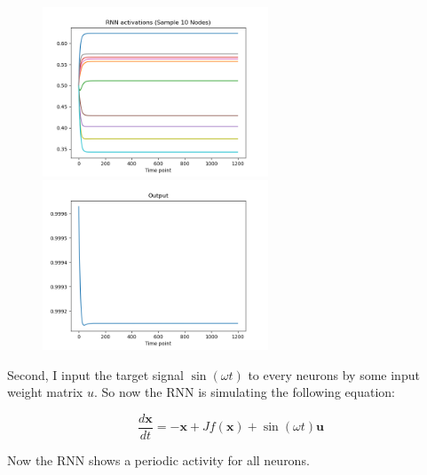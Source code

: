 \documentclass[12pt, a4paper]{article}
\begin{document}
\begin{figure}[H]
    \centering
    \includegraphics[width=0.6\textwidth]{RNN/FORCE/fig/FORCE_nofb_activations.png} \\
    \includegraphics[width=0.6\textwidth]{RNN/FORCE/fig/FORCE_nofb_output.png} \\
\end{figure}

Second, I input the target signal $\sin(\omega t)$ to every neurons by some input weight matrix $u$. So now the RNN is simulating the following equation:

$$\frac{d\mathbf{x}}{dt} = -\mathbf{x} + J f(\mathbf{x}) + \sin (\omega t) \mathbf{u} $$

Now the RNN shows a periodic activity for all neurons.
\end{document}
